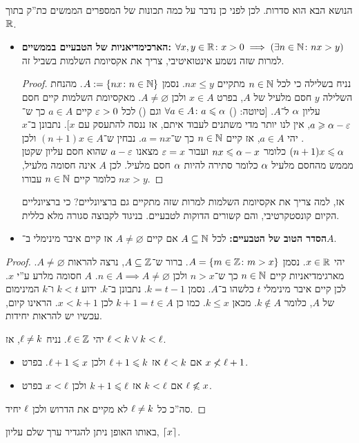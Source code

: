 \documentclass[name=רשימות חשבון דיפרנציאלי ואינטגרלי 1א]{../../../tex/classes/megasumPreamble}
\begin{document}
	הנושא הבא הוא סדרות. לכן לפני כן נדבר על כמה תכונות של המספרים הממשים כת''ק בתוך $\mathbb{R}$.
	\begin{itemize}
		\item \textbf{הארכימדיאניות של הטבעיים בממשיים: }\hfill $\forall x, y \in \mathbb{R} \colon x > 0 \implies (\exists n \in \mathbb{N} \colon nx > y)$\\
		 למרות שזה נשמע אינטואיטיבי, צריך את אקסיומת השלמות בשביל זה.
		\begin{proof}
			נניח בשלילה כי לכל $n \in \mathbb{N}$ מתקיים $nx \le y$. נסמן $A := \{nx \colon n \in \mathbb{N}\}$. מהנחת השלילה $y$ חסם מלעיל של $A$, בפרט $x \in A$ ולכן $A \neq \varnothing$. מאקסיומת השלמות קיים חסם עליון $\alpha$ ל־$A$. [טיוטה: () $\forall a \in A \colon a \leqslant \alpha$ וגם () לכל $\eg > 0$ קיים $a \in A$ כך ש־$a \ge \ag - \eg$, אין לנו יותר מדי משתנים לעבוד איתם, אז ננסה להתעסק עם $x$]. נתבונן ב־$x$. יהי $a \in A$, אז קיים $n \in \mathbb{N}$ כך ש־$a = nx$. נבחין ש־$(n + 1)x \in A$ ולכן $(n + 1)x \leqslant \alpha$ כלומר $nx \leqslant \alpha - x$ ועבור $\eg = x$ מצאנו $a - \eg$ שהוא חסם עליון שקטן מממש מהחסם מלעיל $\alpha$ כלומר סתירה להיות $\alpha$ חסם מלעיל. לכן $A$ אינה חסומה מלעיל, כלומר קיים $n \in \mathbb{N}$ עבורו $nx > y$.
		\end{proof}

		אז, למה צריך את אקסיומת השלמות למרות שזה מתקיים גם ברציונליים? כי ברציונליים הקיום קונסטקרטיבי, והם קשורים הדוקות לטבעיים. בניגוד לקבוצה סגורה מלא כללית.
		\item \textbf{הסדר הטוב של הטבעיים: }לכל $A \subseteq \mathbb{N}$ אם קיים $A \neq \varnothing$ אז קיים איבר מינימלי ב־$A$.

	\end{itemize}

	\begin{proof}
		יהי $x \in \mathbb{R}$. נסמן $A = \{m \in \mathbb{Z} \colon m > x\}$. ברור ש־$A \subseteq \mathbb{Z}$, נרצה להראות $A \neq \varnothing$. מארגימדיאניות קיים $n \in \mathbb{N}$ כך ש־$n > x$ ולכן $n \in A \implies A \neq \varnothing$. $A$ חסומה מלרע ע''י $x$. לכן קיים איבר מינימלי $t$ כלשהו ב־$A$. נסמן $k = t - 1$. נתבונן ב־$k$. ידוע $k < t$ ו־$k$ המינימום של $A$, כלומר $k \notin A$. מכאן $k \le x$. כמו כן $k + 1 = t \in A$ לכן $x < k + 1$. הראינו קיום, עכשיו יש להראות יחידות.

		יהי $\ell \in \mathbb{Z}$. נניח $\ell \neq k$, אז $\ell < k \lor k < \ell$.
		\begin{itemize}
			\item אם $\ell < k$ אז $\ell + 1 \leqslant k$ ולכן $\ell + 1 \leqslant x$. בפרט $x \not< \ell + 1$.
			\item אם $k < \ell$ אז $k + 1 \leqslant \ell$ ולכן $x < \ell$ בפרט $\ell \not\leqslant x$.
		\end{itemize}
		סה''כ כל $\ell \neq k$ לא מקיים את הדרוש ולכן $\ell$ יחיד.
	\end{proof}
	באותו האופן ניתן להגדיר ערך שלם עליון, $\left\lceil x \right\rceil$.
\end{document}
